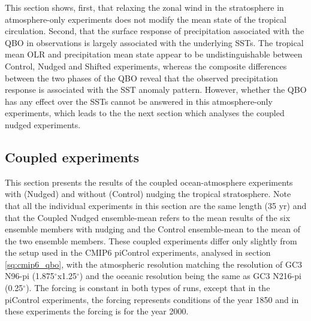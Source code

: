 
This section shows, first, that relaxing the zonal wind in the stratosphere in atmosphere-only experiments does not modify the mean state of the tropical circulation. Second, that the surface response of precipitation associated with the QBO in observations is largely associated with the underlying SSTs. The tropical mean OLR and precipitation mean state appear to be undistinguishable between Control, Nudged and Shifted experiments, whereas the composite differences between the two phases of the QBO reveal that the observed precipitation response is associated with the SST anomaly pattern. However, whether the QBO has any effect over the SSTs cannot be answered in this atmosphere-only experiments, which leads to the the next section which analyses the coupled nudged experiments. 

\subsection{Coupled experiments}


This section presents the results of the coupled ocean-atmosphere experiments with (Nudged) and without (Control) nudging the tropical stratosphere. Note that all the individual experiments in this section are the same length (35 yr) and that the Coupled Nudged  ensemble-mean refers to the mean results of the six ensemble members with nudging and the Control ensemble-mean to the mean of the two ensemble members.
These coupled experiments differ only slightly from the setup used in the CMIP6 piControl experiments, analysed in section \ref{sq:cmip6_qbo}, with the atmospheric resolution matching the resolution of GC3 N96-pi (1.875$^\circ$x1.25$^\circ$) and the oceanic resolution being the same as GC3 N216-pi (0.25$^\circ$). The forcing is constant in both types of runs, except that in the piControl experiments, the forcing represents conditions of the year 1850 and in these experiments the forcing is for the year 2000. 

